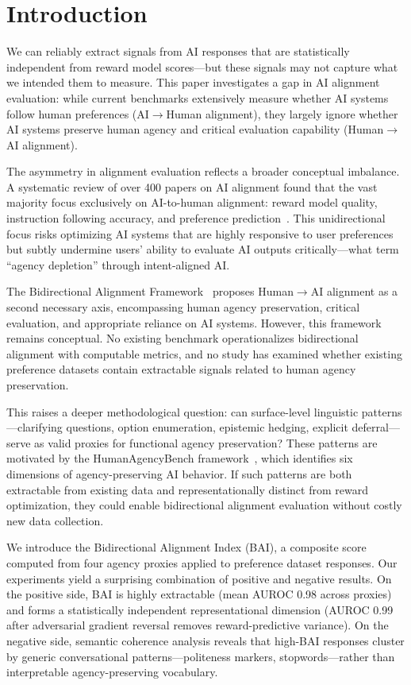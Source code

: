 \section{Introduction}

We can reliably extract signals from AI responses that are statistically independent from reward model scores---but these signals may not capture what we intended them to measure. This paper investigates a gap in AI alignment evaluation: while current benchmarks extensively measure whether AI systems follow human preferences (AI$\rightarrow$Human alignment), they largely ignore whether AI systems preserve human agency and critical evaluation capability (Human$\rightarrow$AI alignment).

The asymmetry in alignment evaluation reflects a broader conceptual imbalance. A systematic review of over 400 papers on AI alignment found that the vast majority focus exclusively on AI-to-human alignment: reward model quality, instruction following accuracy, and preference prediction~\citep{Shen2024}. This unidirectional focus risks optimizing AI systems that are highly responsive to user preferences but subtly undermine users' ability to evaluate AI outputs critically---what \citet{Mitelut2023} term ``agency depletion'' through intent-aligned AI.

The Bidirectional Alignment Framework~\citep{Shen2024} proposes Human$\rightarrow$AI alignment as a second necessary axis, encompassing human agency preservation, critical evaluation, and appropriate reliance on AI systems. However, this framework remains conceptual. No existing benchmark operationalizes bidirectional alignment with computable metrics, and no study has examined whether existing preference datasets contain extractable signals related to human agency preservation.

This raises a deeper methodological question: can surface-level linguistic patterns---clarifying questions, option enumeration, epistemic hedging, explicit deferral---serve as valid proxies for functional agency preservation? These patterns are motivated by the HumanAgencyBench framework~\citep{HumanAgencyBench2024}, which identifies six dimensions of agency-preserving AI behavior. If such patterns are both extractable from existing data and representationally distinct from reward optimization, they could enable bidirectional alignment evaluation without costly new data collection.

We introduce the Bidirectional Alignment Index (BAI), a composite score computed from four agency proxies applied to preference dataset responses. Our experiments yield a surprising combination of positive and negative results. On the positive side, BAI is highly extractable (mean AUROC 0.98 across proxies) and forms a statistically independent representational dimension (AUROC 0.99 after adversarial gradient reversal removes reward-predictive variance). On the negative side, semantic coherence analysis reveals that high-BAI responses cluster by generic conversational patterns---politeness markers, stopwords---rather than interpretable agency-preserving vocabulary.

